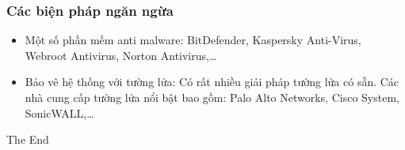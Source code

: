 \documentclass{beamer}
\begin{document}


\begin{frame}
\frametitle{Các biện pháp ngăn ngừa}
     \begin{itemize}
    \item Một số phần mềm anti malware: BitDefender, Kaspersky Anti-Virus, Webroot Antivirus, Norton Antivirus,…
    \item Bảo vê hệ thống với tường lửa:  Có rất nhiều giải pháp tường lửa có sẵn. Các nhà cung cấp tường lửa nổi bật bao gồm: Palo Alto Networks, Cisco System, SonicWALL,…
    
\end{itemize}

\end{frame}


\begin{frame}
\Huge{\centerline{The End}}
\end{frame}

\end{document}
